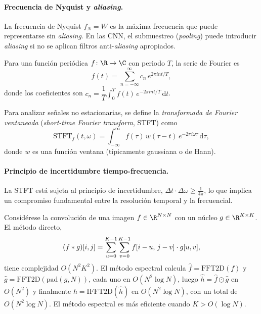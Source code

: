 \paragraph{Frecuencia de Nyquist y \emph{aliasing}.}
La frecuencia de Nyquist $f_N = W$ es la m\'axima frecuencia que puede
representarse sin \emph{aliasing}. En las CNN, el submuestreo (\emph{pooling})
puede introducir \emph{aliasing} si no se aplican filtros anti-\emph{aliasing}
apropiados.

\begin{definition}
\label{def:grids:fourier-series}
Para una funci\'on peri\'odica $f \colon \R \to \C$ con periodo $T$, la serie de
Fourier es
\[
  f(t) = \sum_{n=-\infty}^{\infty} c_n\, e^{2\pi i n t/T},
\]
donde los coeficientes son
$c_n = \dfrac{1}{T} \int_0^T f(t)\, e^{-2\pi i n t/T}\, \mathrm{d}t$.
\end{definition}

\begin{definition}
\label{def:grids:stft}
Para analizar se\~nales no estacionarias, se define la \emph{transformada de
Fourier ventaneada} (\emph{short-time Fourier transform}, STFT) como
\[
  \mathrm{STFT}_f(t, \omega)
   = \int_{-\infty}^{\infty} f(\tau)\, w(\tau - t)\, e^{-2\pi i \omega \tau}\, \mathrm{d}\tau,
\]
donde $w$ es una funci\'on ventana (t\'ipicamente gaussiana o de Hann).
\end{definition}

\paragraph{Principio de incertidumbre tiempo-frecuencia.}
La STFT est\'a sujeta al principio de incertidumbre,
$\Delta t \cdot \Delta \omega \geq \frac{1}{4\pi}$, lo que implica un compromiso
fundamental entre la resoluci\'on temporal y la frecuencial.

\begin{example}
\label{ex:grids:fft-complexity}
Consid\'erese la convoluci\'on de una imagen $f \in \R^{N \times N}$ con un
n\'ucleo $g \in \R^{K \times K}$. El m\'etodo directo,
\[
  (f * g)[i,j] = \sum_{u=0}^{K-1} \sum_{v=0}^{K-1} f[i-u,\, j-v] \cdot g[u,v],
\]
tiene complejidad $O(N^2 K^2)$. El m\'etodo espectral calcula
$\hat{f} = \mathrm{FFT2D}(f)$ y $\hat{g} = \mathrm{FFT2D}(\mathrm{pad}(g,N))$,
cada uno en $O(N^2 \log N)$, luego $\hat{h} = \hat{f} \odot \hat{g}$ en $O(N^2)$
y finalmente $h = \mathrm{IFFT2D}(\hat{h})$ en $O(N^2 \log N)$, con un total de
$O(N^2 \log N)$. El m\'etodo espectral es m\'as eficiente cuando
$K > O(\log N)$.
\end{example}

